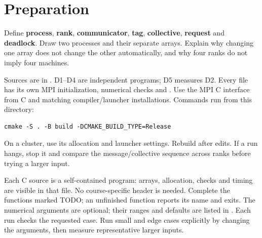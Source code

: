 \section{Preparation}
Define \textbf{process}, \textbf{rank}, \textbf{communicator}, \textbf{tag},
\textbf{collective}, \textbf{request} and \textbf{deadlock}. Draw two processes
and their separate arrays. Explain why changing one array does not change the
other automatically, and why four ranks do not imply four machines.

Sources are in . D1--D4 are independent programs;
D5 measures D2. Every file has its own MPI initialization, numerical checks and
. Use the MPI C interface from C and matching compiler/launcher
installations. Commands run from this  directory:
\begin{lstlisting}[style=shell]
cmake -S . -B build -DCMAKE_BUILD_TYPE=Release
\end{lstlisting}
On a cluster, use its allocation and launcher settings. Rebuild after edits.
If a run hangs, stop it and compare the message/collective sequence across ranks
before trying a larger input.

Each C source is a self-contained program: arrays, allocation, checks and
timing are visible in that file. No course-specific header is needed. Complete
the functions marked TODO; an unfinished function reports its name and exits.
The numerical arguments are optional; their ranges and defaults are listed in
. Each run checks the requested case. Run small and edge cases
explicitly by changing the arguments, then measure representative larger inputs.

